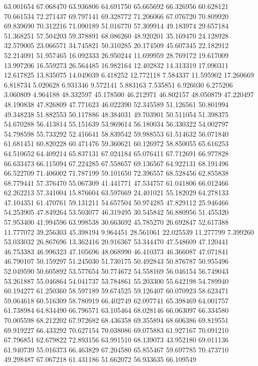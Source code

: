 63.001654
67.068470
63.936806
64.691750
65.665692
66.326956
60.628121
70.661534
72.271437
69.797141
69.328772
71.206066
67.076720
70.809920
69.839690
70.312216
71.090189
51.016770
57.309914
49.183974
29.657184
51.368251
57.504203
59.378891
68.086260
48.920201
35.169470
24.128928
32.579005
23.066571
34.745821
50.310285
20.174509
45.607345
22.182912
52.214091
51.957465
16.092333
26.950244
11.699959
28.769172
19.617009
13.997206
16.559273
26.564485
16.982164
12.402832
14.313319
17.090311
12.617825
13.835075
14.049039
6.418252
12.772118
7.584337
11.595902
17.260669
6.818734
5.020628
6.931346
9.572141
5.883163
7.535851
6.926030
6.275206
3.060809
4.964188
48.332597
45.178500
46.212971
46.802157
48.050879
47.220497
48.190838
47.826809
47.771623
46.022390
52.345589
51.126561
50.801994
49.348238
51.882553
50.117886
48.384031
49.703901
50.511054
51.398375
54.670288
56.413814
55.151639
53.969614
56.180034
56.330322
54.002797
54.798598
55.733292
52.416641
58.839542
59.988553
61.514632
56.071840
61.681451
60.820228
60.471476
59.360621
60.126972
58.850055
65.616253
64.510652
64.409214
65.837131
67.024184
65.076411
67.712691
66.977828
66.633473
66.115094
67.224285
67.558657
69.136567
64.922131
68.191496
66.522709
71.406002
71.787199
59.101650
72.396557
68.528456
62.855838
68.779441
57.376470
55.067309
41.441771
47.534757
61.041806
66.012466
62.262213
57.341004
15.876604
63.597669
24.401021
55.182029
64.278133
47.104351
61.470761
59.131211
54.657504
50.974285
47.829112
25.946466
54.253905
47.849264
53.503077
46.319495
30.545842
56.880956
51.455320
57.953400
41.994596
63.998538
30.663692
45.785270
26.692847
52.617388
11.777072
39.256303
45.398194
9.964451
28.561061
22.025539
11.277799
7.399260
53.033032
26.867696
13.362416
20.916367
53.344470
47.548609
47.120441
46.753383
46.996323
47.105696
48.068990
46.410373
46.366087
47.071841
46.790107
50.159297
51.245030
51.730175
50.492843
50.876787
50.955496
52.049590
50.605892
53.577654
50.774672
54.558169
56.046154
56.749043
53.261887
55.046864
54.041737
53.784861
55.203300
55.642198
54.789940
60.194277
61.250360
58.597189
59.674525
59.126407
60.070923
58.623471
59.064618
60.516309
58.780919
66.402749
62.097741
65.398469
64.001757
61.738984
64.834490
66.796571
63.105464
68.028146
66.063097
66.334580
70.005598
68.212202
67.972682
68.436358
69.355894
68.606386
69.819551
69.919227
66.433292
70.627154
70.038086
69.075883
61.927167
70.091210
67.796851
62.679822
72.893156
63.991510
68.139073
43.952180
69.011136
61.940739
55.016373
66.463829
67.204580
65.855467
59.697785
70.473710
49.298487
67.067218
61.431186
51.662072
56.933635
66.109549
